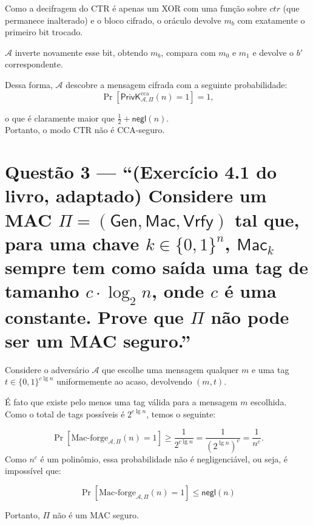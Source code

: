 \documentclass[11pt,a4paper]{article}
\newcommand{\Gen}{\mathsf{Gen}}
\newcommand{\Mac}{\mathsf{Mac}}
\newcommand{\Vrfy}{\mathsf{Vrfy}}
\newcommand{\negl}{\mathsf{negl}}
\begin{document}
    Como a decifragem do CTR é apenas um XOR com uma função sobre $ctr$ (que permanece inalterado) e o bloco cifrado, o oráculo devolve
    $m_b$ com exatamente o primeiro bit trocado.

    $\mathcal{A}$ inverte novamente esse bit, obtendo $m_b$, compara com
    $m_0$ e $m_1$ e devolve o $b'$ correspondente.

    Dessa forma, $\mathcal{A}$ descobre a mensagem cifrada com a seguinte probabilidade:
    \[
        \Pr\!\left[\mathsf{PrivK}^{\mathrm{cca}}_{\mathcal{A},\Pi}(n) = 1\right] = 1,
    \]

    o que é claramente maior que $\frac{1}{2} + \negl(n)$. \\

    Portanto, o modo CTR não é CCA-seguro.

    \clearpage

    \section*{Questão 3 --- ``(Exercício 4.1 do livro, adaptado) Considere um MAC
        $\Pi = (\Gen, \Mac, \Vrfy)$ tal que, para uma chave $k \in \{0,1\}^{n}$, $\Mac_k$
        sempre tem como saída uma tag de tamanho $c \cdot \log_2 n$, onde $c$ é uma
        constante. Prove que $\Pi$ não pode ser um MAC seguro.''}

    Considere o adversário $\mathcal{A}$ que escolhe uma mensagem qualquer $m$ e uma tag
    $t \in \{0,1\}^{c \lg n}$ uniformemente ao acaso, devolvendo $(m, t)$.

    É fato que existe pelo menos uma tag válida para a mensagem $m$ escolhida.
    Como o total de tags possíveis é $2^{c \lg n}$, temos o seguinte:

    \[
        \Pr\left[\text{Mac-forge}_{\mathcal{A},\Pi}(n) = 1\right]
        \ge \frac{1}{2^{c \lg n}}
        = \frac{1}{(2^{\lg n})^c}
        = \frac{1}{n^c}.
    \]
    Como $n^c$ é um polinômio, essa probabilidade não é negligenciável, ou seja, é impossível que:

    \[
        \Pr\left[\text{Mac-forge}_{\mathcal{A},\Pi}(n) = 1\right]
        \le \negl(n)
    \]

    Portanto, $\Pi$ não é um MAC seguro.

    \clearpage

\end{document}
